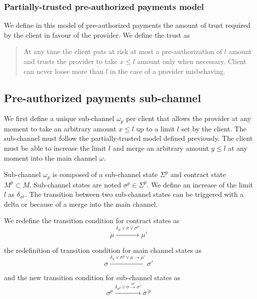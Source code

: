 \documentclass{llncs}
\begin{document}
\subsubsection{Partially-trusted pre-authorized payments model} We define in this model of pre-authorized payments the amount of trust required by the client in favour of the provider. We define the trust as

\begin{quote}
    At any time the client puts at risk at most a pre-authorization of $l$ amount and trusts the provider to take $x \leq l$ amount only when necessary. Client can never loose more than $l$ in the case of a provider misbehaving.
\end{quote}

\subsection{Pre-authorized payments sub-channel} We first define a unique sub-channel $\omega_p$ per client that allows the provider at any moment to take an arbitrary amount $x \leq l$ up to a limit $l$ set by the client. The sub-channel must follow the partially-trusted model defined previously. The client must be able to increase the limit $l$ and merge an arbitrary amount $y \leq l$ at any moment into the main channel $\omega$.


Sub-channel $\omega_p$ is composed of a sub-channel state $\Sigma^p$ and contract state $M^p \subset M$. Sub-channel states are noted $\sigma^p \in \Sigma^p$. We define an increase of the limit $l$ as $\delta_{\sigma^p}$. The transition between two sub-channel states can be triggered with a delta or because of a merge into the main channel.

We redefine the transition condition for contract states as
$$\mu \xrightarrow{\delta_\mu \lor \sigma \lor \sigma^p} \mu'$$

the redefinition of transition condition for main channel states as
$$\sigma \xrightarrow{\delta_\sigma \lor \sigma^p \lor \mu \rightarrow \mu'} \sigma'$$

and the new transition condition for sub-channel states as
$$\sigma^p \xrightarrow{\delta_{\sigma^p} \lor \sigma \xrightarrow{\sigma^p} \sigma'} \sigma^{\prime p}$$
\end{document}
